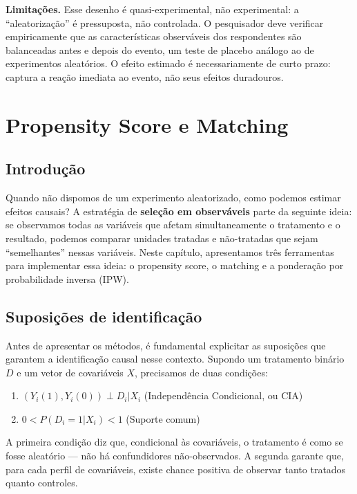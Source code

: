 \documentclass[
]{article}
\begin{document}
\textbf{Limitações.} Esse desenho é quasi-experimental, não experimental: a ``aleatorização'' é pressuposta, não controlada. O pesquisador deve verificar empiricamente que as características observáveis dos respondentes são balanceadas antes e depois do evento, um teste de placebo análogo ao de experimentos aleatórios. O efeito estimado é necessariamente de curto prazo: captura a reação imediata ao evento, não seus efeitos duradouros.

\section{Propensity Score e Matching}\label{propensity-score-e-matching}

\subsection{Introdução}\label{introduuxe7uxe3o-4}

Quando não dispomos de um experimento aleatorizado, como podemos estimar efeitos causais? A estratégia de \textbf{seleção em observáveis} parte da seguinte ideia: se observamos todas as variáveis que afetam simultaneamente o tratamento e o resultado, podemos comparar unidades tratadas e não-tratadas que sejam ``semelhantes'' nessas variáveis. Neste capítulo, apresentamos três ferramentas para implementar essa ideia: o propensity score, o matching e a ponderação por probabilidade inversa (IPW).

\subsection{Suposições de identificação}\label{suposiuxe7uxf5es-de-identificauxe7uxe3o}

Antes de apresentar os métodos, é fundamental explicitar as suposições que garantem a identificação causal nesse contexto. Supondo um tratamento binário \(D\) e um vetor de covariáveis \(X\), precisamos de duas condições:

\begin{enumerate}
\def\labelenumi{\arabic{enumi}.}
\item
  \((Y_i(1), Y_i(0)) \perp D_i|X_i\) (Independência Condicional, ou CIA)
\item
  \(0 < P(D_i=1|X_i) < 1\) (Suporte comum)
\end{enumerate}

A primeira condição diz que, condicional às covariáveis, o tratamento é como se fosse aleatório --- não há confundidores não-observados. A segunda garante que, para cada perfil de covariáveis, existe chance positiva de observar tanto tratados quanto controles.
\end{document}
